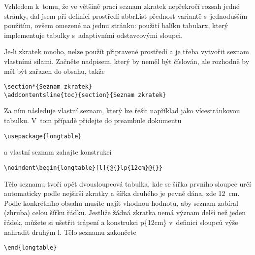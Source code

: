\documentclass[FM,DP,EN]{tulthesis}
\newcommand{\argument}[1]{{\ttfamily\color{\tulcolor}#1}}
\newenvironment{myquote}{\begin{list}{}{\setlength\leftmargin\parindent}\item[]}{\end{list}}
\newenvironment{listing}{\begin{myquote}\color{\tulcolor}}{\end{myquote}}
\begin{document}
Vzhledem k~tomu, že ve většině prací seznam zkratek nepřekročí rozsah jedné
stránky, dal jsem při definici prostředí \argument{abbrList} přednost variantě
s~jednodušším použitím, ovšem omezené na jednu stránku: použití balíku
\argument{tabularx}, který implementuje tabulky s~adaptivními odstavcovými
sloupci.

Je-li zkratek mnoho, nelze použít připravené prostředí a je třeba vytvořit
seznam vlastními silami. Začněte nadpisem, který by neměl být číslován, ale
rozhodně by měl být zařazen do obsahu, takže

\begin{listing}
\begin{verbatim}
\section*{Seznam zkratek}
\addcontentsline{toc}{section}{Seznam zkratek}
\end{verbatim}
\end{listing}

Za ním následuje vlastní seznam, který lze řešit například jako vícestránkovou
tabulku. V~tom případě přidejte do preambule dokumentu

\begin{listing}
\begin{verbatim}
\usepackage{longtable}
\end{verbatim}
\end{listing}

a vlastní seznam zahajte konstrukcí

\begin{listing}
\begin{verbatim}
\noindent\begin{longtable}[l]{@{}lp{12cm}@{}}
\end{verbatim}
\end{listing}

Tělo seznamu tvoří opět dvousloupcová tabulka, kde se šířka prvního sloupce
určí automaticky podle nejširší zkratky a šířka druhého je pevně dána, zde
12~cm. Podle konkrétního obsahu musíte najít vhodnou hodnotu, aby seznam
zabíral (zhruba) celou šířku řádku. Jestliže žádná zkratka nemá význam delší
než jeden řádek, můžete si ušetřit trápení a konstrukci \argument{p\{12cm\}}
v~definici sloupců výše nahradit druhým \argument{l}. Tělo seznamu zakončete

\begin{listing}
\begin{verbatim}
\end{longtable}
\end{verbatim}
\end{listing}
\end{document}
